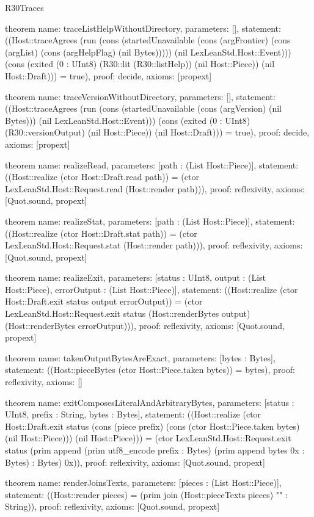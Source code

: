 \begin{lexlean}{R30Traces}
\begin{semanticmodule}
theorem{
  name: traceListHelpWithoutDirectory,
  parameters: [],
  statement: ((Host::traceAgrees (run (cons (startedUnavailable (cons (argFrontier) (cons (argList) (cons (argHelpFlag) (nil Bytes))))) (nil LexLeanStd.Host::Event))) (cons (exited (0 : UInt8) (R30::lit (R30::listHelp)) (nil Host::Piece)) (nil Host::Draft))) = true),
  proof: decide{},
  axioms: [propext]
}

theorem{
  name: traceVersionWithoutDirectory,
  parameters: [],
  statement: ((Host::traceAgrees (run (cons (startedUnavailable (cons (argVersion) (nil Bytes))) (nil LexLeanStd.Host::Event))) (cons (exited (0 : UInt8) (R30::versionOutput) (nil Host::Piece)) (nil Host::Draft))) = true),
  proof: decide{},
  axioms: [propext]
}

theorem{
  name: realizeRead,
  parameters: [path : (List Host::Piece)],
  statement: ((Host::realize (ctor Host::Draft.read path)) = (ctor LexLeanStd.Host::Request.read (Host::render path))),
  proof: reflexivity{},
  axioms: [Quot.sound, propext]
}

theorem{
  name: realizeStat,
  parameters: [path : (List Host::Piece)],
  statement: ((Host::realize (ctor Host::Draft.stat path)) = (ctor LexLeanStd.Host::Request.stat (Host::render path))),
  proof: reflexivity{},
  axioms: [Quot.sound, propext]
}

theorem{
  name: realizeExit,
  parameters: [status : UInt8, output : (List Host::Piece), errorOutput : (List Host::Piece)],
  statement: ((Host::realize (ctor Host::Draft.exit status output errorOutput)) = (ctor LexLeanStd.Host::Request.exit status (Host::renderBytes output) (Host::renderBytes errorOutput))),
  proof: reflexivity{},
  axioms: [Quot.sound, propext]
}

theorem{
  name: takenOutputBytesAreExact,
  parameters: [bytes : Bytes],
  statement: ((Host::pieceBytes (ctor Host::Piece.taken bytes)) = bytes),
  proof: reflexivity{},
  axioms: []
}

theorem{
  name: exitComposesLiteralAndArbitraryBytes,
  parameters: [status : UInt8, prefix : String, bytes : Bytes],
  statement: ((Host::realize (ctor Host::Draft.exit status (cons (piece prefix) (cons (ctor Host::Piece.taken bytes) (nil Host::Piece))) (nil Host::Piece))) = (ctor LexLeanStd.Host::Request.exit status (prim append (prim utf8_encode prefix : Bytes) (prim append bytes 0x : Bytes) : Bytes) 0x)),
  proof: reflexivity{},
  axioms: [Quot.sound, propext]
}

theorem{
  name: renderJoinsTexts,
  parameters: [pieces : (List Host::Piece)],
  statement: ((Host::render pieces) = (prim join (Host::pieceTexts pieces) "" : String)),
  proof: reflexivity{},
  axioms: [Quot.sound, propext]
}


\end{semanticmodule}
\end{lexlean}
